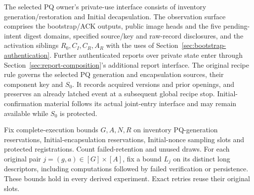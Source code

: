 \documentclass[pdflatex]{sn-jnl}
\theoremstyle{thmstyleone}
\theoremstyle{thmstylethree}
\theoremstyle{thmstyletwo}
\begin{document}
The selected PQ owner's private-use interface consists of inventory
generation/restoration and Initial decapsulation. The observation surface
comprises the bootstrap/ACK outputs, public image heads and the five
pending-intent digest domains, specified source/key and raw-record
disclosures, and the activation siblings $R_0,C_I,C_R,A_R$ with the uses
of Section~\ref{sec:bootstrap-authentication}. Further authenticated
reports over private state enter through
Section~\ref{sec:report-composition}'s additional report interface.
The original recipe rule governs the selected PQ generation and
encapsulation sources, their component key and $S_0$. It records
acquired versions and prior openings, and preserves an already latched
event at a subsequent global recipe stop. Initial-confirmation material
follows its actual joint-entry interface and may remain available while
$S_0$ is protected.

Fix complete-execution bounds $G,A,N,R$ on inventory PQ-generation
reservations, Initial-encapsulation reservations, Initial-nonce sampling
slots and protected registrations. Count failed-retention and unused
draws. For each original pair $j=(g,a)\in[G]\times[A]$, fix a bound
$L_j$ on its distinct long descriptors, including computations followed
by failed verification or persistence. These bounds hold in every derived
experiment. Exact retries reuse their original slots.
\end{document}

